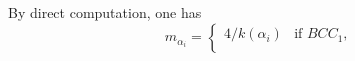 \documentclass[11pt]{amsart}
\newcommand{\w}{\mathrm{w}}
\newcommand{\nw}{\mathrm{nw}}
\begin{document}
{\begin{center}
\begin{table}[h]
{\begin{tabular}{|c||c|c|c||c|c|c||c|c|}
\end{tabular}}
\end{table}
\end{center}
\vskip -5mm
By direct computation, one has
\begin{equation}\label{data-exponent3}
m_{\alpha_i}=\begin{cases}
4/k(\alpha_i) & \text{if $BCC_1$},\\

\end{cases}
\end{equation}}
\end{document}
